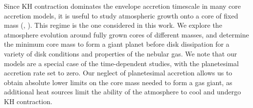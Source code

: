 \documentclass[apj, numberedappendix]{emulateapj}
\begin{document}


Since KH contraction dominates the envelope accretion timescale in many core accretion models, it is useful to study atmospheric growth onto a core of fixed mass (\citealt{ikoma00}, \citealt{pn05}). This regime is the one considered in this work. We explore the atmosphere evolution around fully grown cores of different masses, and determine the minimum core mass to form a giant planet before disk dissipation for a variety of disk conditions and properties of the nebular gas. We note that our models are a special case of the time-dependent studies, with the planetesimal accretion rate set to zero. Our neglect of planetesimal accretion allows us to obtain absolute lower limits on the core mass needed to form a gas giant, as additional heat sources limit the ability of the atmosphere to cool and undergo KH contraction.



\end{document}
